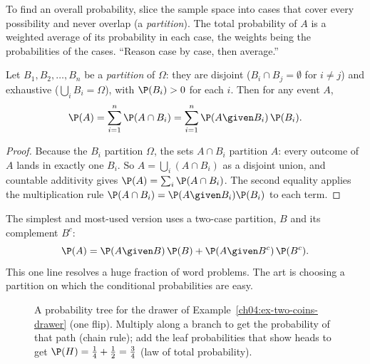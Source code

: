 \begin{intuitionbox}
To find an overall probability, slice the sample space into cases that cover every possibility and never overlap (a \emph{partition}). The total probability of $A$ is a weighted average of its probability in each case, the weights being the probabilities of the cases. ``Reason case by case, then average.''
\end{intuitionbox}

\begin{theorem}
\label{ch04:lotp}
Let $B_1, B_2, \dots, B_n$ be a \emph{partition} of $\Omega$: they are disjoint ($B_i \cap B_j = \emptyset$ for $i\ne j$) and exhaustive ($\bigcup_i B_i = \Omega$), with $\P(B_i) > 0$ for each $i$. Then for any event $A$,
\[
\P(A) = \sum_{i=1}^{n} \P(A \cap B_i) = \sum_{i=1}^{n} \P(A \given B_i)\,\P(B_i).
\]
\end{theorem}

\begin{proof}
Because the $B_i$ partition $\Omega$, the sets $A \cap B_i$ partition $A$: every outcome of $A$ lands in exactly one $B_i$. So $A = \bigcup_i (A\cap B_i)$ as a disjoint union, and countable additivity gives $\P(A) = \sum_i \P(A\cap B_i)$. The second equality applies the multiplication rule $\P(A\cap B_i) = \P(A\given B_i)\P(B_i)$ to each term.
\end{proof}

The simplest and most-used version uses a two-case partition, $B$ and its complement $B^c$:
\[
\P(A) = \P(A\given B)\,\P(B) + \P(A \given B^c)\,\P(B^c).
\]
This one line resolves a huge fraction of word problems. The art is choosing a partition on which the conditional probabilities are easy.

\begin{figure}[H]
\centering
{}
\caption{A probability tree for the drawer of Example~\ref{ch04:ex-two-coins-drawer} (one flip). Multiply along a branch to get the probability of that path (chain rule); add the leaf probabilities that show heads to get $\P(H) = \tfrac14 + \tfrac12 = \tfrac34$ (law of total probability).}
\label{ch04:fig-tree}
\end{figure}

